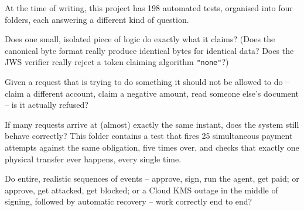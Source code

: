\documentclass[11pt]{report}
\newcommand{\file}[1]{\texttt{#1}}
\newcommand{\code}[1]{\texttt{#1}}
\begin{document}
At the time of writing, this project has 198 automated tests, organised
into four folders, each answering a different kind of question.

\begin{description}[leftmargin=2em, style=nextline]
\item[\file{tests/unit}] Does one small, isolated piece of logic do
  exactly what it claims? (Does the canonical byte format really produce
  identical bytes for identical data? Does the JWS verifier really reject
  a token claiming algorithm \code{"none"}?)
\item[\file{tests/security}] Given a request that is trying to do
  something it should not be allowed to do -- claim a different account,
  claim a negative amount, read someone else's document -- is it actually
  refused?
\item[\file{tests/concurrency}] If many requests arrive at (almost)
  exactly the same instant, does the system still behave correctly? This
  folder contains a test that fires 25 simultaneous payment attempts
  against the same obligation, five times over, and checks that exactly
  one physical transfer ever happens, every single time.
\item[\file{tests/integration}] Do entire, realistic sequences of events
  -- approve, sign, run the agent, get paid; or approve, get attacked,
  get blocked; or a Cloud KMS outage in the middle of signing, followed by
  automatic recovery -- work correctly end to end?
\end{description}
\end{document}
